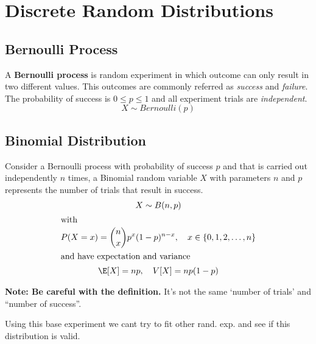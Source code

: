 

\section{Discrete Random Distributions} %
\label{sec:discrete_random_distributions}

\subsection{Bernoulli Process} %
\label{sub:bernoulli_process}

A \textbf{Bernoulli process} is random experiment in which outcome can only
result in two different values. This outcomes are commonly referred as
\emph{success} and \emph{failure}. The probability of success is $0 \leq p
\leq 1$ and all experiment trials are \emph{independent}.
\begin{equation*}
    X \sim Bernoulli(p)
\end{equation*}

\subsection{Binomial Distribution} %
\label{sub:binomial_distribution}

Consider a Bernoulli process with probability of success $p$ and that is carried
out independently $n$ times, a Binomial random variable $X$ with parameters $n$
and $p$ represents the number of trials that result in success.
\begin{gather*}
    X \sim B(n, p)\\
    \intertext{with}
    P(X=x) = \binom{n}{x}p^x(1-p)^{n-x}, \quad x \in \{0,1,2,\dots,n\}\\
    \intertext{and have expectation and variance}
    \E[X] = np, \quad V[X] = np(1-p)
\end{gather*}

\textbf{Note: Be careful with the definition.} It's not the same \enquote*{number of
trials} and \enquote{number of success}. 

Using this base experiment we cant try to fit other rand. exp. and see if this 
distribution is valid.

